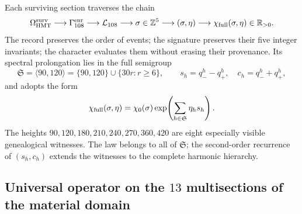 Each surviving section traverses the chain
\begin{equation}
 \Omega_{\rm HMT}^{\rm surv}
 \longrightarrow\Gamma_{108}^{\rm enr}
 \longrightarrow\mathcal L_{108}
 \longrightarrow\sigma\in\mathbb Z^5
 \longrightarrow(\sigma,\eta)
 \longrightarrow\chi_{\rm full}(\sigma,\eta)\in\mathbb R_{>0}.
 \label{eq:cadena-genealogica-ley-masa-autonoma}
\end{equation}
The record preserves the order of events; the signature preserves their five
integer invariants; the character evaluates them without erasing their provenance. Its
spectral prolongation lies in the full semigroup
\begin{equation}
 \mathfrak S=\langle90,120\rangle
 =\{90,120\}\cup\{30r:r\ge6\},
 \qquad
 s_h=q_-^h-q_+^h,
 \quad c_h=q_-^h+q_+^h,
 \label{eq:semigrupo-global-masas-autonoma}
\end{equation}
and adopts the form
\begin{equation}
 \chi_{\rm full}(\sigma,\eta)
 =\chi_0(\sigma)
  \exp\!\left(\sum_{h\in\mathfrak S}\eta_hs_h\right).
 \label{eq:caracter-completo-masas-autonoma}
\end{equation}
The heights \(90,120,180,210,240,270,360,420\) are eight especially visible
genealogical witnesses. The law belongs to all of
\(\mathfrak S\); the second-order recurrence of \((s_h,c_h)\) extends
the witnesses to the complete harmonic hierarchy.

\subsection{Universal operator on the \(13\) multisections of the material domain}


